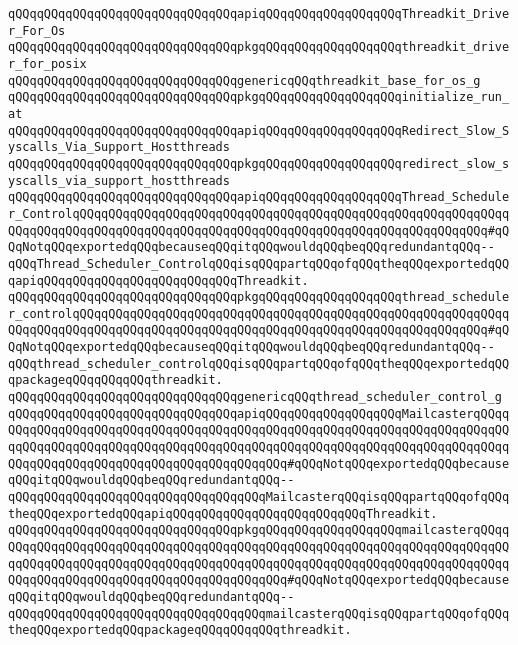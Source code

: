 \verb|qQQqqQQqqQQqqQQqqQQqqQQqqQQqqQQqapiqQQqqQQqqQQqqQQqqQQqThreadkit_Driver_For_Os|\newline
\verb|qQQqqQQqqQQqqQQqqQQqqQQqqQQqqQQqpkgqQQqqQQqqQQqqQQqqQQqthreadkit_driver_for_posix|\newline
\newline
\verb|qQQqqQQqqQQqqQQqqQQqqQQqqQQqqQQqgenericqQQqthreadkit_base_for_os_g|\newline
\newline
\verb|qQQqqQQqqQQqqQQqqQQqqQQqqQQqqQQqpkgqQQqqQQqqQQqqQQqqQQqinitialize_run_at|\newline
\newline
\verb|qQQqqQQqqQQqqQQqqQQqqQQqqQQqqQQqapiqQQqqQQqqQQqqQQqqQQqRedirect_Slow_Syscalls_Via_Support_Hostthreads|\newline
\verb|qQQqqQQqqQQqqQQqqQQqqQQqqQQqqQQqpkgqQQqqQQqqQQqqQQqqQQqredirect_slow_syscalls_via_support_hostthreads|\newline
\newline
\verb|qQQqqQQqqQQqqQQqqQQqqQQqqQQqqQQqapiqQQqqQQqqQQqqQQqqQQqThread_Scheduler_ControlqQQqqQQqqQQqqQQqqQQqqQQqqQQqqQQqqQQqqQQqqQQqqQQqqQQqqQQqqQQqqQQqqQQqqQQqqQQqqQQqqQQqqQQqqQQqqQQqqQQqqQQqqQQqqQQqqQQqqQQqqQQqqQQq#qQQqNotqQQqexportedqQQqbecauseqQQqitqQQqwouldqQQqbeqQQqredundantqQQq--qQQqThread_Scheduler_ControlqQQqisqQQqpartqQQqofqQQqtheqQQqexportedqQQqapiqQQqqQQqqQQqqQQqqQQqqQQqqQQqThreadkit.|\newline
\verb|qQQqqQQqqQQqqQQqqQQqqQQqqQQqqQQqpkgqQQqqQQqqQQqqQQqqQQqthread_scheduler_controlqQQqqQQqqQQqqQQqqQQqqQQqqQQqqQQqqQQqqQQqqQQqqQQqqQQqqQQqqQQqqQQqqQQqqQQqqQQqqQQqqQQqqQQqqQQqqQQqqQQqqQQqqQQqqQQqqQQqqQQqqQQqqQQq#qQQqNotqQQqexportedqQQqbecauseqQQqitqQQqwouldqQQqbeqQQqredundantqQQq--qQQqthread_scheduler_controlqQQqisqQQqpartqQQqofqQQqtheqQQqexportedqQQqpackageqQQqqQQqqQQqthreadkit.|\newline
\verb|qQQqqQQqqQQqqQQqqQQqqQQqqQQqqQQqgenericqQQqthread_scheduler_control_g|\newline
\newline
\verb|qQQqqQQqqQQqqQQqqQQqqQQqqQQqqQQqapiqQQqqQQqqQQqqQQqqQQqMailcasterqQQqqQQqqQQqqQQqqQQqqQQqqQQqqQQqqQQqqQQqqQQqqQQqqQQqqQQqqQQqqQQqqQQqqQQqqQQqqQQqqQQqqQQqqQQqqQQqqQQqqQQqqQQqqQQqqQQqqQQqqQQqqQQqqQQqqQQqqQQqqQQqqQQqqQQqqQQqqQQqqQQqqQQqqQQqqQQqqQQqqQQq#qQQqNotqQQqexportedqQQqbecauseqQQqitqQQqwouldqQQqbeqQQqredundantqQQq--qQQqqQQqqQQqqQQqqQQqqQQqqQQqqQQqqQQqMailcasterqQQqisqQQqpartqQQqofqQQqtheqQQqexportedqQQqapiqQQqqQQqqQQqqQQqqQQqqQQqqQQqThreadkit.|\newline
\verb|qQQqqQQqqQQqqQQqqQQqqQQqqQQqqQQqpkgqQQqqQQqqQQqqQQqqQQqmailcasterqQQqqQQqqQQqqQQqqQQqqQQqqQQqqQQqqQQqqQQqqQQqqQQqqQQqqQQqqQQqqQQqqQQqqQQqqQQqqQQqqQQqqQQqqQQqqQQqqQQqqQQqqQQqqQQqqQQqqQQqqQQqqQQqqQQqqQQqqQQqqQQqqQQqqQQqqQQqqQQqqQQqqQQqqQQqqQQqqQQqqQQq#qQQqNotqQQqexportedqQQqbecauseqQQqitqQQqwouldqQQqbeqQQqredundantqQQq--qQQqqQQqqQQqqQQqqQQqqQQqqQQqqQQqqQQqmailcasterqQQqisqQQqpartqQQqofqQQqtheqQQqexportedqQQqpackageqQQqqQQqqQQqthreadkit.|\newline
